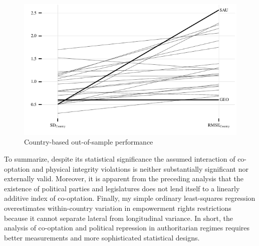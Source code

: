 \begin{figure}[!htb]
  \centering
  \includegraphics[width = \linewidth]{./sections/04extension/testSamplePred.pdf}
  \caption{Country-based out-of-sample performance}
  \label{fig:testSample}
\end{figure}

To summarize, despite its statistical significance the 
assumed interaction of co-optation and physical integrity 
violations is neither substantially significant nor
externally valid. Moreover, it is apparent from the 
preceding analysis that the existence of political parties 
and legislatures does not lend itself to a linearly additive
index of co-optation. Finally, my simple ordinary 
least-squares regression overestimates within-country 
variation in empowerment rights restrictions because it 
cannot separate lateral from longitudinal variance. In 
short, the analysis of co-optation and political repression 
in authoritarian regimes requires better measurements and 
more sophisticated statistical designs.